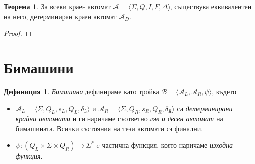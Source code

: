 \documentclass[11pt, oneside]{article}
\theoremstyle{definition}
\newtheorem{definition}{Дефиниция}[section]
\newtheorem{theorem}{Теорема}[section]
\begin{document}
\begin{theorem}
	За всеки краен автомат \(\mathcal{A} = \langle \Sigma, Q, I, F, \Delta \rangle \), съществува еквивалентен на него, детерминиран краен автомат \( \mathcal{A}_D \).
	\begin{proof}
		
	\end{proof}
\end{theorem}

\section{Бимашини}

\begin{definition}
	 \emph{Бимашина} дефинираме като тройка \( \mathcal{B} = \langle \mathcal{A}_L, \mathcal{A}_R, \psi \rangle \), където

	\begin{itemize}
		\item \( \mathcal{A}_L = \langle \Sigma, Q_L, s_L, Q_L, \delta_L \rangle \) и \( \mathcal{A}_R = \langle \Sigma, Q_R, s_R, Q_R, \delta_R \rangle \) са \emph{детерминирани крайни автомати} и ги наричаме съответно \emph{ляв и десен автомат} на бимашината. Всички състояния на тези автомати са финални.
		\item \( \psi:(Q_L \times \Sigma \times Q_R) \to \Sigma^* \) e частична функция, която наричаме \emph{изходна функция}.
	\end{itemize}
\end{definition}
\end{document}
